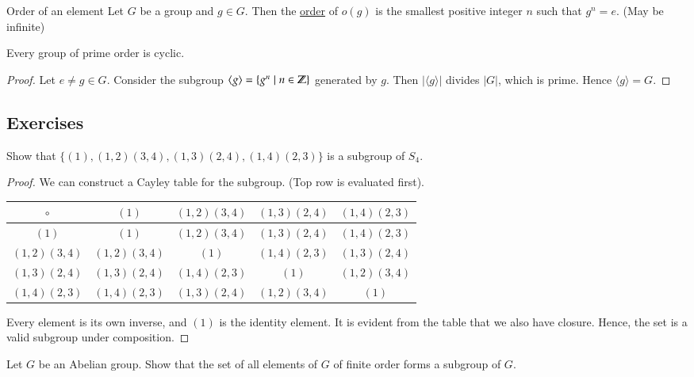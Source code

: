 \begin{defn}{Order of an element}
Let $G$ be a group and $g\in G$. Then the \ul{order} of $o(g)$ is the smallest positive integer $n$ such that $g^n=e$. (May be infinite)
\end{defn}

\begin{proposition}
	Every group of prime order is cyclic. 
\end{proposition}
\begin{proof}
Let $e\neq g\in G$. Consider the subgroup $\langle g \rangle =\{g^n\mid n\in \mathbb{Z}\}$ generated by $g$. Then $|\langle g \rangle|$ divides $|G|$, which is prime. Hence $\langle g \rangle = G$. 
\end{proof}

\subsection{Exercises}

\exercise
Show that $\{(1), (1, 2)(3, 4), (1, 3)(2, 4), (1, 4)(2, 3)\}$ is a subgroup of $S_4$. 

\begin{proof}
We can construct a Cayley table for the subgroup. (Top row is evaluated first). 

\begin{center}
\begin{tabular}{c|cccc}
$\circ$        & $(1)$          & $(1, 2)(3, 4)$ & $(1, 3)(2, 4)$ & $(1, 4)(2, 3)$ \\ \hline
$(1)$          & $(1)$          & $(1, 2)(3, 4)$ & $(1, 3)(2, 4)$ & $(1, 4)(2, 3)$ \\
$(1, 2)(3, 4)$ & $(1, 2)(3, 4)$ & $(1)$          & $(1, 4)(2, 3)$ & $(1, 3)(2, 4)$ \\
$(1, 3)(2, 4)$ & $(1, 3)(2, 4)$ & $(1, 4)(2, 3)$ & $(1)$          & $(1, 2)(3, 4)$ \\
$(1, 4)(2, 3)$ & $(1, 4)(2, 3)$ & $(1, 3)(2, 4)$ & $(1, 2)(3, 4)$ & $(1)$         
\end{tabular}
\end{center}

Every element is its own inverse, and $(1)$ is the identity element. It is evident from the table that we also have closure. Hence, the set is a valid subgroup under composition. 
\end{proof}

\exercise
Let $G$ be an Abelian group. Show that the set of all elements of $G$ of finite order forms a subgroup of $G$. 

